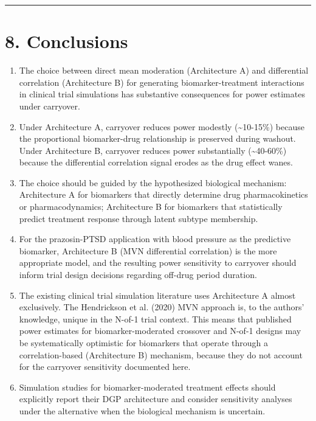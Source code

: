 \documentclass[
]{article}
\begin{document}
\bigskip\noindent

\rule{\textwidth}{0.4pt}\bigskip

\section{8. Conclusions}

\begin{enumerate}
\item The choice between direct mean moderation (Architecture A) and
  differential correlation (Architecture B) for generating
  biomarker-treatment interactions in clinical trial simulations
  has substantive consequences for power estimates under
  carryover.

\item Under Architecture A, carryover reduces power modestly
  (\textasciitilde{}10-15\%) because the proportional biomarker-drug relationship
  is preserved during washout. Under Architecture B, carryover
  reduces power substantially (\textasciitilde{}40-60\%) because the differential
  correlation signal erodes as the drug effect wanes.

\item The choice should be guided by the hypothesized biological
  mechanism: Architecture A for biomarkers that directly
  determine drug pharmacokinetics or pharmacodynamics;
  Architecture B for biomarkers that statistically predict
  treatment response through latent subtype membership.

\item For the prazosin-PTSD application with blood pressure as the
  predictive biomarker, Architecture B (MVN differential
  correlation) is the more appropriate model, and the resulting
  power sensitivity to carryover should inform trial design
  decisions regarding off-drug period duration.

\item The existing clinical trial simulation literature uses
  Architecture A almost exclusively. The Hendrickson et al.
  (2020) MVN approach is, to the authors' knowledge, unique in the
  N-of-1 trial context. This means that published power
  estimates for biomarker-moderated crossover and N-of-1
  designs may be systematically optimistic for biomarkers
  that operate through a correlation-based (Architecture B)
  mechanism, because they do not account for the carryover
  sensitivity documented here.

\item Simulation studies for biomarker-moderated treatment effects
  should explicitly report their DGP architecture and consider
  sensitivity analyses under the alternative when the biological
  mechanism is uncertain.
\end{enumerate}
\end{document}
